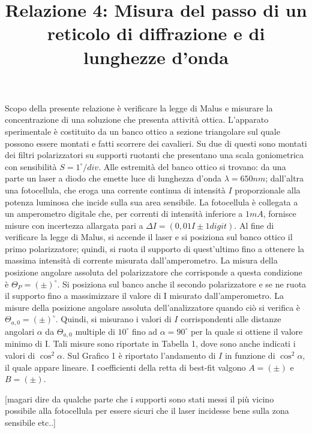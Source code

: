 \documentclass{article}
\title{Relazione 4: Misura del passo di un reticolo di diffrazione e di lunghezze d'onda}
\date{}
\begin{document}
		
	\maketitle
	
	Scopo della presente relazione è verificare la legge di Malus e misurare la concentrazione di una soluzione che presenta attività ottica. L'apparato sperimentale è costituito da un banco ottico a sezione triangolare sul quale possono essere montati e fatti scorrere dei cavalieri. Su due di questi sono montati dei filtri polarizzatori su supporti ruotanti che presentano una scala goniometrica con sensibilità $S=1^{\circ}/div$. Alle estremità del banco ottico si trovano: da una parte un laser a diodo che emette luce di lunghezza d'onda $\lambda=650nm$; dall'altra una fotocellula, che eroga una corrente continua di intensità $I$ proporzionale alla potenza luminosa che incide sulla sua area sensibile. La fotocellula è collegata a un amperometro digitale che, per correnti di intensità inferiore a $1mA$, fornisce misure con incertezza allargata pari a $\Delta I = (0,01 I \pm 1 digit)$.
	Al fine di verificare la legge di Malus, si accende il laser e si posiziona sul banco ottico il primo polarizzatore; quindi, si ruota il supporto di quest'ultimo fino a ottenere la massima intensità di corrente misurata dall'amperometro. La misura della posizione angolare assoluta del polarizzatore che corrisponde a questa condizione è $\Theta_P=(\pm)^{\circ}$. Si posiziona sul banco anche il secondo polarizzatore e se ne ruota il supporto fino a massimizzare il valore di I misurato dall'amperometro. La misure della posizione angolare assoluta dell'analizzatore quando ciò si verifica è $\Theta_{a,0}=(\pm)^{\circ}$. Quindi, si misurano i valori di $I$ corrispondenti alle distanze angolari $\alpha$ da $\Theta_{a,0}$ multiple di $10^{\circ}$ fino ad $\alpha=90^{\circ}$ per la quale si ottiene il valore minimo di I. Tali misure sono riportate in Tabella 1, dove sono anche indicati i valori di $\cos^2\alpha$. Sul Grafico 1 è riportato l'andamento di $I$ in funzione di $\cos^2\alpha$, il quale appare lineare. I coefficienti della retta di best-fit valgono $A=(\pm)$ e $B=(\pm)$.
	
	[magari dire da qualche parte che i supporti sono stati messi il più vicino possibile alla fotocellula per essere sicuri che il laser incidesse bene sulla zona sensibile etc..]
	
\end{document}

